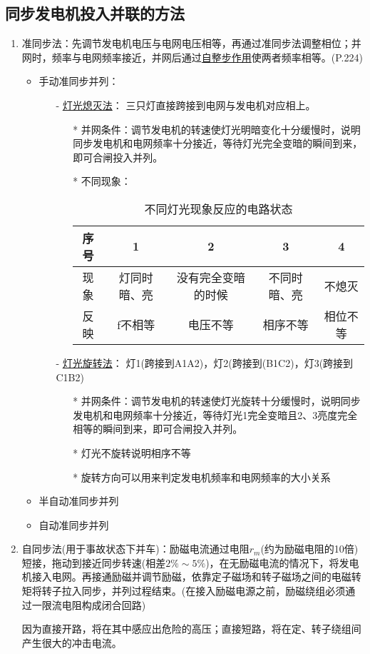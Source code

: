 \documentclass[blue]{elegantnote}
\begin{document}
\subsection{同步发电机投入并联的方法}
\begin{enumerate}
	\item 准同步法：{\color{thid}先调节发电机电压与电网电压相等，再通过准同步法调整相位；并网时，频率与电网频率接近，并网后通过\underline{自整步作用}使两者频率相等。}(P.224)
	\begin{itemize}
		\item 手动准同步并列：
		\begin{itemize}
			\item[-] {\color{thid}\underline{灯光熄灭法}}： 三只灯直接跨接到电网与发电机对应相上。
			\begin{itemize}
				\item[*] 并网条件：调节发电机的转速使灯光明暗变化十分缓慢时，说明同步发电机和电网频率十分接近，等待灯光完全变暗的瞬间到来，即可合闸投入并列。
				\item[*] 不同现象：
			\begin{table}[htbp]
				\centering
				\caption{不同灯光现象反应的电路状态}
				\begin{tabular}{|c|c|c|c|c|}
					\hline
					序号    & 1     & 2     & 3     & 4 \\\hline
					现象    & 灯同时暗、亮 & 没有完全变暗的时候 & 不同时暗、亮 & 不熄灭 \\\hline
					反映    & f不相等  & 电压不等  & 相序不等  & 相位不等 \\\hline
				\end{tabular}%
			\end{table}%
			\end{itemize}
			\item[-] {\color{thid}\underline{灯光旋转法}}： 灯1(跨接到A1A2)，灯2(跨接到(B1C2)，灯3(跨接到C1B2)
				\begin{itemize}
					\item[*] 并网条件：调节发电机的转速使灯光旋转十分缓慢时，说明同步发电机和电网频率十分接近，等待灯光1完全变暗且2、3亮度完全相等的瞬间到来，即可合闸投入并列。
					\item[*] 灯光不旋转说明相序不等
					\item[*] 旋转方向可以用来判定发电机频率和电网频率的大小关系
				\end{itemize}
		\end{itemize}
		\item 半自动准同步并列
		\item 自动准同步并列
	\end{itemize}
	\item 自同步法{\color{thid}(用于事故状态下并车)}：励磁电流通过电阻$r_m$(约为励磁电阻的10倍)短接，拖动到接近同步转速(相差$2\%\sim5\%$)，在无励磁电流的情况下，将发电机接入电网。再接通励磁并调节励磁，依靠定子磁场和转子磁场之间的电磁转矩将转子拉入同步，并列过程结束。{\color{blue}(在接入励磁电源之前，励磁绕组必须通过一限流电阻构成闭合回路)}
	\begin{note}
		因为直接开路，将在其中感应出危险的高压；直接短路，将在定、转子绕组间产生很大的冲击电流。	
	\end{note}
\end{enumerate}
\end{document}

